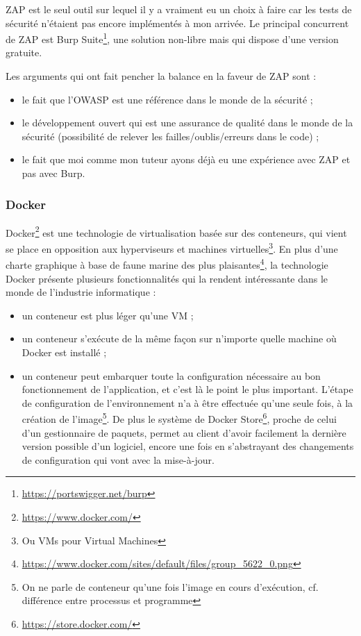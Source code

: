 ZAP est le seul outil sur lequel il y a vraiment eu un choix à faire car les tests de sécurité n'étaient pas encore implémentés à mon arrivée. Le principal concurrent de ZAP est Burp Suite\footnote{\url{https://portswigger.net/burp}}, une solution non-libre mais qui dispose d'une version gratuite. 

Les arguments qui ont fait pencher la balance en la faveur de ZAP sont :
\begin{itemize}[label=$\bullet$]
  \item le fait que l'OWASP est une référence dans le monde de la sécurité ;
  \item le développement ouvert qui est une assurance de qualité dans le monde de la sécurité (possibilité de relever les failles/oublis/erreurs dans le code) ;
  \item le fait que moi comme mon tuteur ayons déjà eu une expérience avec ZAP et pas avec Burp.
\end{itemize}

\subsubsection{Docker}
Docker\footnote{\url{https://www.docker.com/}} est une technologie de virtualisation basée sur des conteneurs, qui vient se place en opposition aux hyperviseurs et machines virtuelles\footnote{Ou VMs pour Virtual Machines}. En plus d'une charte graphique à base de faune marine des plus plaisantes\footnote{\url{https://www.docker.com/sites/default/files/group_5622_0.png}}, la technologie Docker présente plusieurs fonctionnalités qui la rendent intéressante dans le monde de l'industrie informatique :
\begin{itemize}[label=$\bullet$]
\item un conteneur est plus léger qu'une VM ;
\item un conteneur s'exécute de la même façon sur n'importe quelle machine où Docker est installé ;
\item un conteneur peut embarquer toute la configuration nécessaire au bon fonctionnement de l'application, et c'est là le point le plus important. L'étape de configuration de l'environnement n'a à être effectuée qu'une seule fois, à la création de l'image\footnote{On ne parle de conteneur qu'une fois l'image en cours d'exécution, cf. différence entre processus et programme}. De plus le système de Docker Store\footnote{\url{https://store.docker.com/}}, proche de celui d'un gestionnaire de paquets, permet au client d'avoir facilement la dernière version possible d'un logiciel, encore une fois en s'abstrayant des changements de configuration qui vont avec la mise-à-jour.
\end{itemize}

